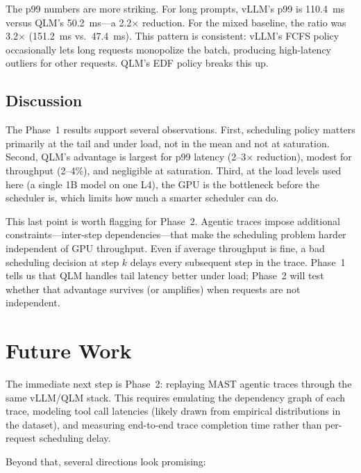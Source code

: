 \documentclass[10pt, twocolumn, letterpaper]{article}
\begin{document}
The p99 numbers are more striking. For long prompts, vLLM's p99 is 110.4~ms versus QLM's 50.2~ms---a 2.2$\times$ reduction. For the mixed baseline, the ratio was 3.2$\times$ (151.2~ms vs.\ 47.4~ms). This pattern is consistent: vLLM's FCFS policy occasionally lets long requests monopolize the batch, producing high-latency outliers for other requests. QLM's EDF policy breaks this up.

\subsection{Discussion}

The Phase~1 results support several observations. First, scheduling policy matters primarily at the tail and under load, not in the mean and not at saturation. Second, QLM's advantage is largest for p99 latency (2--3$\times$ reduction), modest for throughput (2--4\%), and negligible at saturation. Third, at the load levels used here (a single 1B model on one L4), the GPU is the bottleneck before the scheduler is, which limits how much a smarter scheduler can do.

This last point is worth flagging for Phase~2. Agentic traces impose additional constraints---inter-step dependencies---that make the scheduling problem harder independent of GPU throughput. Even if average throughput is fine, a bad scheduling decision at step $k$ delays every subsequent step in the trace. Phase~1 tells us that QLM handles tail latency better under load; Phase~2 will test whether that advantage survives (or amplifies) when requests are not independent.

\section{Future Work}

The immediate next step is Phase~2: replaying MAST agentic traces through the same vLLM/QLM stack. This requires emulating the dependency graph of each trace, modeling tool call latencies (likely drawn from empirical distributions in the dataset), and measuring end-to-end trace completion time rather than per-request scheduling delay.

Beyond that, several directions look promising:
\end{document}
